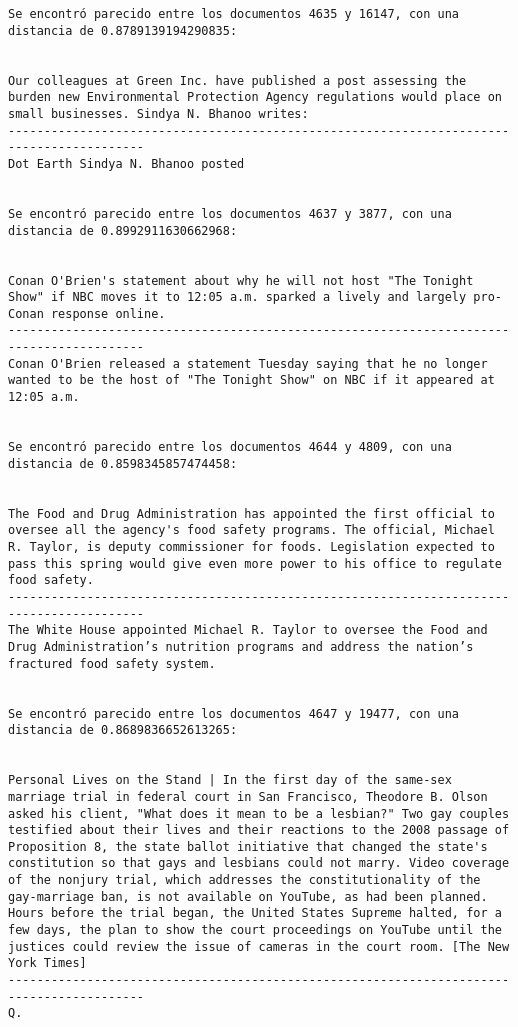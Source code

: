 \documentclass[11pt]{article}
\begin{document}
\begin{Verbatim}[commandchars=\\\{\}]
Se encontró parecido entre los documentos 4635 y 16147, con una distancia de 0.8789139194290835:


Our colleagues at Green Inc. have published a post assessing the burden new Environmental Protection Agency regulations would place on small businesses. Sindya N. Bhanoo writes:
-----------------------------------------------------------------------------------------
Dot Earth Sindya N. Bhanoo posted


Se encontró parecido entre los documentos 4637 y 3877, con una distancia de 0.8992911630662968:


Conan O'Brien's statement about why he will not host "The Tonight Show" if NBC moves it to 12:05 a.m. sparked a lively and largely pro-Conan response online.
-----------------------------------------------------------------------------------------
Conan O'Brien released a statement Tuesday saying that he no longer wanted to be the host of "The Tonight Show" on NBC if it appeared at 12:05 a.m.


Se encontró parecido entre los documentos 4644 y 4809, con una distancia de 0.8598345857474458:


The Food and Drug Administration has appointed the first official to oversee all the agency's food safety programs. The official, Michael R. Taylor, is deputy commissioner for foods. Legislation expected to pass this spring would give even more power to his office to regulate food safety.
-----------------------------------------------------------------------------------------
The White House appointed Michael R. Taylor to oversee the Food and Drug Administration’s nutrition programs and address the nation’s fractured food safety system.


Se encontró parecido entre los documentos 4647 y 19477, con una distancia de 0.8689836652613265:


Personal Lives on the Stand | In the first day of the same-sex marriage trial in federal court in San Francisco, Theodore B. Olson asked his client, "What does it mean to be a lesbian?" Two gay couples testified about their lives and their reactions to the 2008 passage of Proposition 8, the state ballot initiative that changed the state's constitution so that gays and lesbians could not marry. Video coverage of the nonjury trial, which addresses the constitutionality of the gay-marriage ban, is not available on YouTube, as had been planned. Hours before the trial began, the United States Supreme halted, for a few days, the plan to show the court proceedings on YouTube until the justices could review the issue of cameras in the court room. [The New York Times]
-----------------------------------------------------------------------------------------
Q.



\end{Verbatim}
\end{document}
